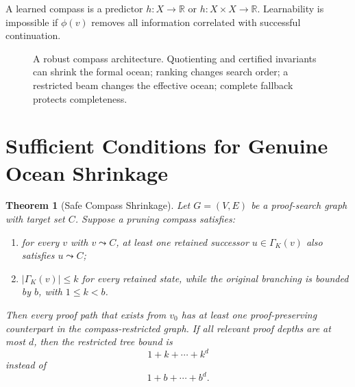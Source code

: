 \documentclass[11pt]{article}
\newtheorem{theorem}{Theorem}[section]
\begin{document}
A learned compass is a predictor \(h:X\to \mathbb{R}\) or \(h:X\times X\to\mathbb{R}\). Learnability is impossible if \(\phi(v)\) removes all information correlated with successful continuation.

\begin{figure}[ht]
\centering
{}
\caption{A robust compass architecture. Quotienting and certified invariants can shrink the formal ocean; ranking changes search order; a restricted beam changes the effective ocean; complete fallback protects completeness.}
\end{figure}

\section{Sufficient Conditions for Genuine Ocean Shrinkage}

\begin{theorem}[Safe Compass Shrinkage]
Let \(G=(V,E)\) be a proof-search graph with target set \(C\). Suppose a pruning compass satisfies:
\begin{enumerate}[label=(S\arabic*)]
\item for every \(v\) with \(v\leadsto C\), at least one retained successor \(u\in\Gamma_K(v)\) also satisfies \(u\leadsto C\);
\item \(|\Gamma_K(v)|\le k\) for every retained state, while the original branching is bounded by \(b\), with \(1\le k<b\).
\end{enumerate}
Then every proof path that exists from \(v_0\) has at least one proof-preserving counterpart in the compass-restricted graph. If all relevant proof depths are at most \(d\), then the restricted tree bound is
\[
1+k+\cdots+k^d
\]
instead of
\[
1+b+\cdots+b^d.
\]
\end{theorem}
\end{document}

